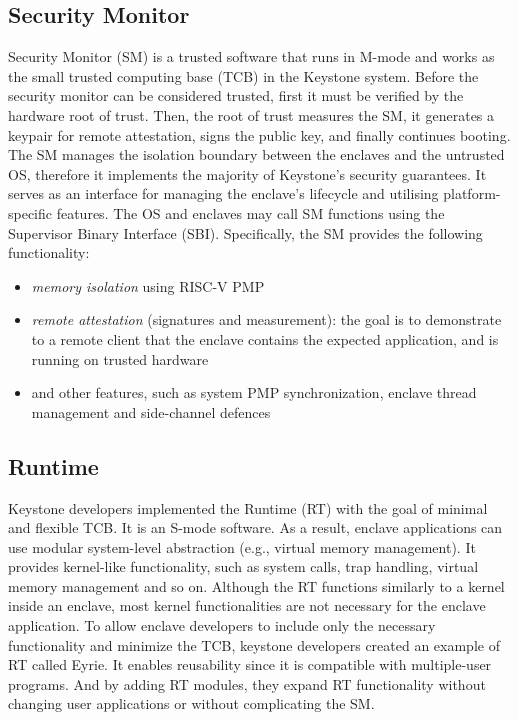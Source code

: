 \subsection{Security Monitor}
Security Monitor (SM) is a trusted software that runs in M-mode and works as the small trusted computing base (TCB) in the Keystone system. Before the security monitor can be considered trusted, first it must be verified by the hardware root of trust. Then, the root of trust measures the SM, it generates a keypair for remote attestation, signs the public key, and finally continues booting. The SM manages the isolation boundary between the enclaves and the untrusted OS, therefore it implements the majority of Keystone's security guarantees.  It serves as an interface for managing the enclave's lifecycle and utilising platform-specific features. The OS and enclaves may call SM functions using the Supervisor Binary Interface (SBI). Specifically, the SM provides the following functionality:
\begin{itemize}
    \item \textit{memory isolation} using RISC-V PMP
    \item \textit{remote attestation} (signatures and measurement): the goal is to demonstrate to a remote client that the enclave contains the expected application, and is running on trusted hardware
    \item and other features, such as system PMP synchronization, enclave thread management and side-channel defences  
\end{itemize}

\subsection{Runtime}
Keystone developers implemented the Runtime (RT) with the goal of minimal and flexible TCB. It is an S-mode software. As a result, enclave applications can use modular system-level abstraction (e.g., virtual memory management). It provides kernel-like functionality, such as system calls, trap handling, virtual memory management and so on. Although the RT functions similarly to a kernel inside an enclave, most kernel functionalities are not necessary for the enclave application. To allow enclave developers to include only the necessary functionality and minimize the TCB, keystone developers created an example of RT called Eyrie. It enables reusability since it is compatible with multiple-user programs. And by adding RT modules, they expand RT functionality without changing user applications or without complicating the SM.

